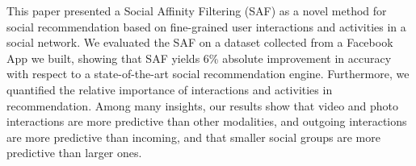 
This paper presented a Social Affinity Filtering (SAF) as a novel method
for social recommendation based on fine-grained user interactions and
activities in a social network. We evaluated the SAF on a dataset collected 
from a Facebook App we built, showing that SAF yields 6\% absolute improvement
in accuracy with respect to a state-of-the-art social recommendation engine.
Furthermore, we quantified the relative importance of interactions and activities in recommendation.
Among many insights, our results show that video and photo interactions are more predictive than other
modalities, and outgoing interactions are more predictive than
incoming, and that smaller social groups are more predictive than
larger ones. 


